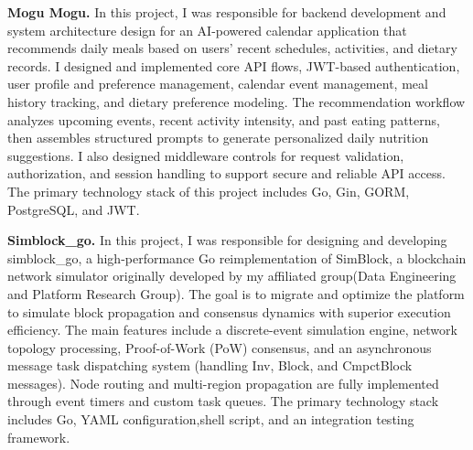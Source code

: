 \documentclass[letterpaper,11pt]{article}
\newcommand{\projectEntry}[2]{%
  \textbf{#1.} #2\par\vspace{0.62em}
}
\begin{document}
\projectEntry{Mogu Mogu}{In this project, I was responsible for backend development and system architecture design for an 
AI-powered calendar application that recommends daily meals based on users' recent schedules, activities, and dietary records. I designed and implemented core API flows, 
JWT-based authentication, user profile and preference management, calendar event management, meal history tracking, and dietary preference modeling. The recommendation workflow analyzes upcoming events, 
recent activity intensity, and past eating patterns, then assembles structured prompts to generate personalized daily nutrition suggestions. I also designed middleware controls for request validation, 
authorization, and session handling to support secure and reliable API access. The primary technology stack of this project includes Go, Gin, GORM, PostgreSQL, and JWT\@.
}
%
%
\projectEntry{Simblock\_go}{In this project, I was responsible for designing and developing simblock\_go, a high-performance Go 
reimplementation of SimBlock, a blockchain network simulator originally developed by my affiliated group(Data Engineering and Platform Research Group). The goal is to migrate and optimize the platform to simulate block propagation and consensus 
dynamics with superior execution efficiency. The main features include a discrete-event simulation engine, network topology processing, Proof-of-Work (PoW) consensus, and an asynchronous message task dispatching system 
(handling Inv, Block, and CmpctBlock messages). Node routing and multi-region propagation are fully implemented through event timers and custom task queues. 
The primary technology stack includes Go, YAML configuration,shell script, and an integration testing framework.
}
\end{document}
